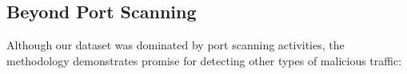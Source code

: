 

    
    

\subsection{Beyond Port Scanning}

Although our dataset was dominated by port scanning activities, the methodology demonstrates promise for detecting other types of malicious traffic:

